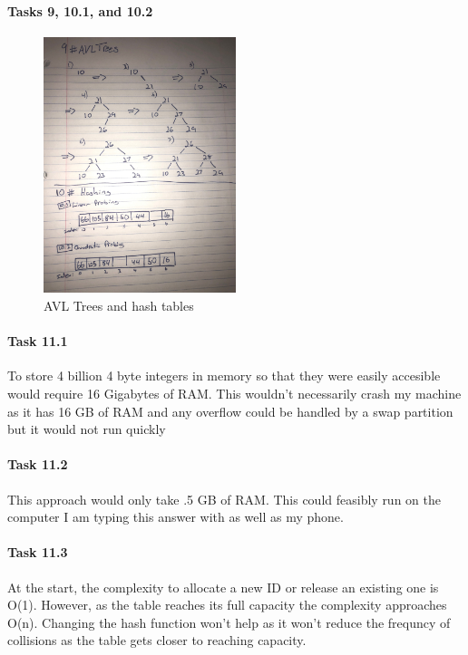 \documentclass[14pt]{article}
\begin{document}
\paragraph{Tasks 9, 10.1, and 10.2}
\begin{figure}[htbp]
 \begin{center}
  \includegraphics[width=0.5\textwidth]{pic.JPG}
  \caption{AVL Trees and hash tables}
 \end{center}
\end{figure}

\paragraph{Task 11.1}
To store 4 billion 4 byte integers in memory so that they were easily accesible would require 16 Gigabytes of RAM. This wouldn't necessarily crash my machine as it has 16 GB of RAM and any overflow could be handled by a swap partition but it would not run quickly
\paragraph{Task 11.2}
This approach would only take .5 GB of RAM. This could feasibly run on the computer I am typing this answer with as well as my phone.
\paragraph{Task 11.3}
At the start, the complexity to allocate a new ID or release an existing one is O(1). However, as the table reaches its full capacity the complexity approaches O(n). Changing the hash function won't help as it won't reduce the frequncy of collisions as the table gets closer to reaching capacity.
\end{document}
